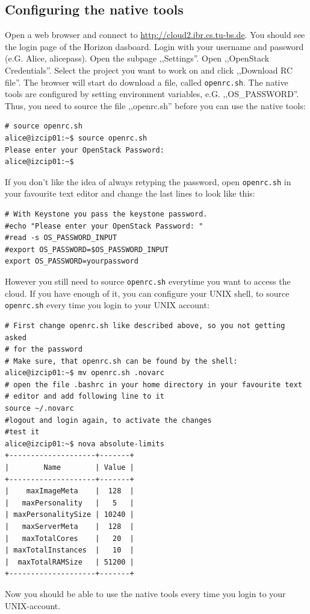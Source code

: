 \documentclass[a4paper,bibtotoc,english,liststotoc]{scrartcl}
\begin{document}
\subsection{Configuring the native tools}
\label{sec:conf-nova-pyth}
Open a web browser and connect to
\url{http://cloud2.ibr.cs.tu-bs.de}. You should see the login page of
the Horizon dasboard. Login with your username and password
(e.G. Alice, alicepass). Open the subpage ,,Settings''. Open
,,OpenStack Credentials''. Select the project you want to work on and
click ,,Download RC file''. The browser will start do download a file,
called \verb|openrc.sh|. The native tools are configured  by setting
environment variables, e.G. ,,OS\_PASSWORD''.  Thus, you need to source
the file ,,openrc.sh'' before you can use the native tools:
\begin{verbatim}
# source openrc.sh
alice@izcip01:~$ source openrc.sh
Please enter your OpenStack Password:
alice@izcip01:~$
\end{verbatim}
If you don't like the idea of always retyping the password, open
\verb|openrc.sh| in your favourite text editor and change the last lines
to look like this:
\begin{verbatim}
# With Keystone you pass the keystone password.
#echo "Please enter your OpenStack Password: "
#read -s OS_PASSWORD_INPUT
#export OS_PASSWORD=$OS_PASSWORD_INPUT
export OS_PASSWORD=yourpassword
\end{verbatim}
However you still need to source \verb|openrc.sh| everytime you want to
access the cloud. If you have enough of it, you can configure your
UNIX shell, to source \verb|openrc.sh| every time you login to your
UNIX account:
\begin{verbatim}
# First change openrc.sh like described above, so you not getting asked
# for the password
# Make sure, that openrc.sh can be found by the shell:
alice@izcip01:~$ mv openrc.sh .novarc
# open the file .bashrc in your home directory in your favourite text
# editor and add following line to it
source ~/.novarc
#logout and login again, to activate the changes
#test it
alice@izcip01:~$ nova absolute-limits
+--------------------+-------+
|        Name        | Value |
+--------------------+-------+
|    maxImageMeta    |  128  |
|   maxPersonality   |   5   |
| maxPersonalitySize | 10240 |
|   maxServerMeta    |  128  |
|   maxTotalCores    |   20  |
| maxTotalInstances  |   10  |
|  maxTotalRAMSize   | 51200 |
+--------------------+-------+
\end{verbatim}
Now you should be able to use the native tools every time you login to
your UNIX-account.
\end{document}
